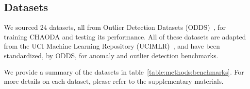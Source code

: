 

\subsection{Datasets}\label{subsec:methods:datasets}

We sourced 24 datasets, all from Outlier Detection Datasets (ODDS)~\cite{rayana2016odds}, for training CHAODA and testing its performance.
All of these datasets are adapted from the UCI Machine Learning Repository (UCIMLR)~\cite{UCIMLR}, and have been standardized, by ODDS, for anomaly and outlier detection benchmarks.

We provide a summary of the datasets in table~\ref{table:methods:benchmarks}.
For more details on each dataset, please refer to the supplementary materials.

